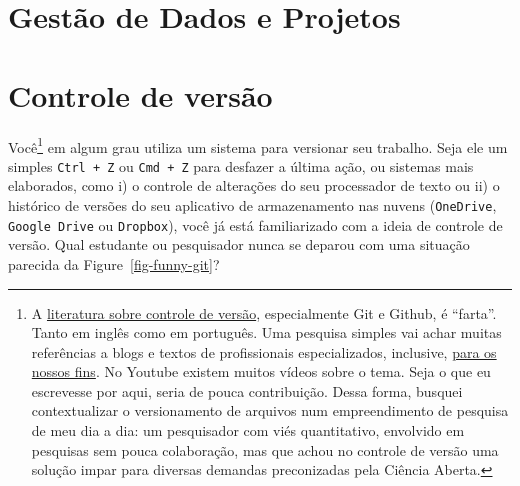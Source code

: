 \documentclass[
  a4paper,
]{article}
\begin{document}

\section{Gestão de Dados e Projetos}\label{sec-project}


\section{Controle de versão}\label{sec-git}

Você\footnote{A \href{https://git-scm.com/book/en/v2}{literatura sobre
  controle de versão}, especialmente Git e Github, é ``farta''. Tanto em
  inglês como em português. Uma pesquisa simples vai achar muitas
  referências a blogs e textos de profissionais especializados,
  inclusive, \href{https://happygitwithr.com/}{para os nossos fins}. No
  Youtube existem muitos vídeos sobre o tema. Seja o que eu escrevesse
  por aqui, seria de pouca contribuição. Dessa forma, busquei
  contextualizar o versionamento de arquivos num empreendimento de
  pesquisa de meu dia a dia: um pesquisador com viés quantitativo,
  envolvido em pesquisas sem pouca colaboração, mas que achou no
  controle de versão uma solução impar para diversas demandas
  preconizadas pela Ciência Aberta.} em algum grau utiliza um sistema
para versionar seu trabalho. Seja ele um simples \texttt{Ctrl\ +\ Z} ou
\texttt{Cmd\ +\ Z} para desfazer a última ação, ou sistemas mais
elaborados, como i) o controle de alterações do seu processador de texto
ou ii) o histórico de versões do seu aplicativo de armazenamento nas
nuvens (\texttt{OneDrive}, \texttt{Google\ Drive} ou \texttt{Dropbox}),
você já está familiarizado com a ideia de controle de versão. Qual
estudante ou pesquisador nunca se deparou com uma situação parecida da
Figure~\ref{fig-funny-git}?
\end{document}
